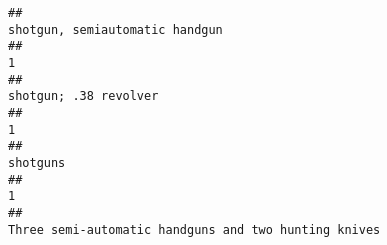 \documentclass[
]{article}
\begin{document}
\begin{verbatim}
##                                                                                                                                                                                                                                                                                                                                                                        shotgun, semiautomatic handgun 
##                                                                                                                                                                                                                                                                                                                                                                                                     1 
##                                                                                                                                                                                                                                                                                                                                                                                 shotgun; .38 revolver 
##                                                                                                                                                                                                                                                                                                                                                                                                     1 
##                                                                                                                                                                                                                                                                                                                                                                                              shotguns 
##                                                                                                                                                                                                                                                                                                                                                                                                     1 
##                                                                                                                                                                                                                                                                                                                                                  Three semi-automatic handguns and two hunting knives 

\end{verbatim}
\end{document}
